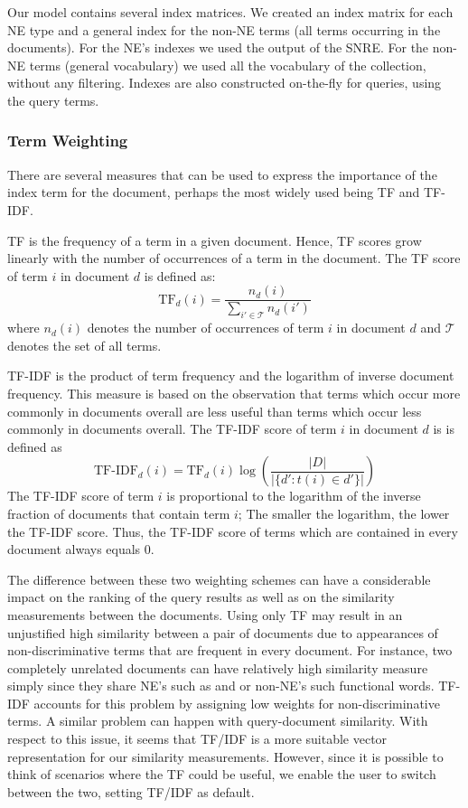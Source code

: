 Our model contains several index matrices. We created an index matrix for each NE type and a general index for the non-NE terms (all terms occurring in the documents). For the NE's indexes we used the output of the SNRE. For the non-NE terms (general vocabulary) we used all the vocabulary of the collection, without any filtering. Indexes are also constructed on-the-fly for queries, using the query terms.

\subsubsection{Term Weighting}
\label{sec:term_weighting}
There are several measures that can be used to express the importance of the index term for the document, perhaps the most widely used being TF and TF-IDF.

TF is the frequency of a term in a given document. Hence, TF scores grow linearly with the number of occurrences of a term in the document. The TF score of term $i$ in document $d$ is defined as:
\[\text{TF}_d(i) = \frac{n_d(i)}{\sum_{i' \in \mathcal{T}}{n_d(i')}}\]
where $n_d(i)$ denotes the number of occurrences of term $i$ in document $d$ and $\mathcal{T}$ denotes the set of all terms. 

TF-IDF is the product of term frequency and the logarithm of inverse document frequency. This measure is based on the observation that terms which occur more commonly in documents overall are less useful than terms which occur less commonly in documents overall. The TF-IDF score of term $i$ in document $d$ is is defined as
\[\text{TF-IDF}_d(i)= \text{TF}_d(i)\log{\left(\frac{|D|}{|\lbrace d' : t(i) \in d' \rbrace|}\right)}\]
The TF-IDF score of term $i$ is proportional to the logarithm of the inverse fraction of documents that contain term $i$; The smaller the logarithm, the lower the TF-IDF score. Thus, the TF-IDF score of terms which are contained in every document always equals $0$.

The difference between these two weighting schemes can have a considerable impact on the ranking of the query results as well as on the similarity measurements between the documents. Using only TF may result in an unjustified high similarity between a pair of documents due to appearances of non-discriminative terms that are frequent in every document. For instance, two completely unrelated documents can have relatively high similarity measure simply since they share NE's such as  and  or non-NE's such functional words. TF-IDF accounts for this problem by assigning low weights for non-discriminative terms. A similar problem can happen with query-document similarity. With respect to this issue, it seems that TF/IDF is a more suitable vector representation for our similarity measurements. However, since it is possible to think of scenarios where the TF could be useful, we enable the user to switch between the two, setting TF/IDF as default. 

